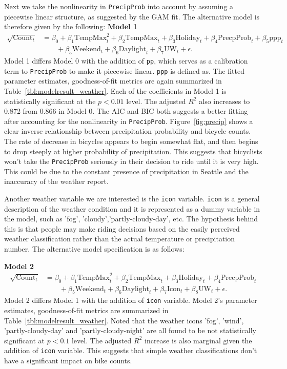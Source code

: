\documentclass [11pt, proquest] {uwthesis}[2015/03/03]
\begin{document}
Next we take the nonlinearity in \texttt{PrecipProb} into account by assuming a piecewise linear structure, as suggested by the GAM fit. The alternative model is therefore given by the following:
\textbf{Model 1}
\begin{align}
\sqrt{\text{Count}_t} &= \beta_0 + \beta_1 \text{TempMax}^2_t + \beta_2 \text{TempMax}_t + \beta_3 \text{Holiday}_t + \beta_4 \text{PrecpProb}_t + \beta_5 \text{ppp}_t  \nonumber\\
&\qquad + \beta_5 \text{Weekend}_t + \beta_6 \text{Daylight}_t + \beta_7 \text{UW}_t + \epsilon.\label{eqref:model1}
\end{align}
Model 1 differs Model 0 with the addition of \texttt{pp}, which serves as a calibration term to \texttt{PrecipProb} to make it piecewise linear. \texttt{ppp} is defined as. The fitted parameter estimates, goodness-of-fit metrics are again summarized in Table~\ref{tbl:modelresult_weather}. Each of the coefficients in Model 1 is statistically significant at the $p<0.01$ level. The adjusted $R^2$ also increases to 0.872 from 0.866 in Model 0. The AIC and BIC both suggests a better fitting after accounting for the nonlinearity in \texttt{PrecipProb}. Figure~\ref{fig:precip} shows a clear inverse relationship between precipitation probability and bicycle counts. The rate of decrease in bicycles appears to begin somewhat flat, and then begins to drop steeply at higher probability of precipitation. This suggests that bicyclists won't take the \texttt{PrecipProb} seriously in their decision to ride until it is very high. This could be due to the constant presence of precipitation in Seattle and the inaccuracy of the weather report.

Another weather variable we are interested is the \texttt{icon} variable. \texttt{icon} is a general description of the weather condition and it is represented as a dummy variable in the model, such as 'fog', 'cloudy','partly-cloudy-day', etc. The hypothesis behind this is that people may make riding decisions based on the easily perceived weather classification rather than the actual temperature or precipitation number. The alternative model specification is as follows:

\textbf{Model 2}
\begin{align}
\sqrt{\text{Count}_t} &= \beta_0 + \beta_1 \text{TempMax}^2_t + \beta_2 \text{TempMax}_t + \beta_3 \text{Holiday}_t + \beta_4 \text{PrecpProb}_t  \nonumber\\
&\qquad + \beta_5 \text{Weekend}_t + \beta_6 \text{Daylight}_t + \beta_7 \text{Icon}_t  + \beta_8 \text{UW}_t + \epsilon.\label{eqref:model2}
\end{align}
Model 2 differs Model 1 with the addition of \texttt{icon} variable. Model 2's parameter estimates, goodness-of-fit metrics are summarized in Table~\ref{tbl:modelresult_weather}. Noted that the weather icons 'fog', 'wind', 'partly-cloudy-day' and 'partly-cloudy-night' are all found to be not statistically significant at $p<0.1$ level. The adjusted $R^2$ increase is also marginal given the addition of \texttt{icon} variable. This suggests that simple weather classifications don't have a significant impact on bike counts.
\end{document}
